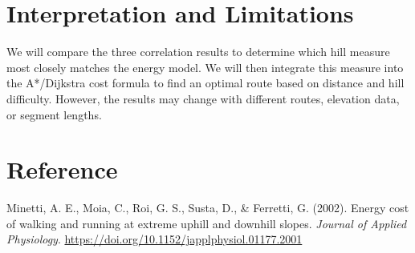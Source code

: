 \documentclass[11pt,letterpaper]{article}
\begin{document}
\section{Interpretation and Limitations}
We will compare the three correlation results to determine which hill measure most closely matches the energy model. We will then integrate this measure into the A*/Dijkstra cost formula to find an optimal route based on distance and hill difficulty. However, the results may change with different routes, elevation data, or segment lengths.

\section*{Reference}
Minetti, A. E., Moia, C., Roi, G. S., Susta, D., \& Ferretti, G. (2002). Energy cost of walking and running at extreme uphill and downhill slopes. \emph{Journal of Applied Physiology}. \url{https://doi.org/10.1152/japplphysiol.01177.2001}
\end{document}
